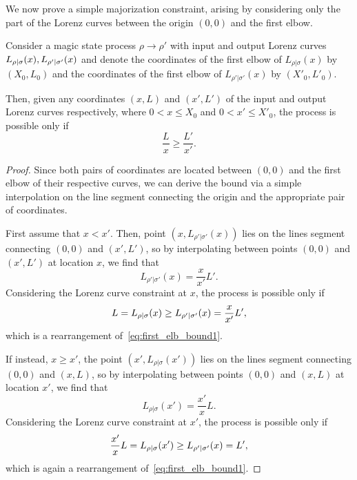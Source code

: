 \documentclass[pra,
aps,
twocolumn,
superscriptaddress,
groupedaddress,
nofootinbib,
reprint
]{revtex4-1}
\begin{document}
We now prove a simple majorization constraint, arising by considering only the part of the Lorenz curves between the origin $(0,0)$ and the first elbow.
\begin{proposition}\label{prop:first_elb}
	Consider a magic state process $\rho \longrightarrow \rho'$ with input and output Lorenz curves ${L_{\rho|\sigma}}(x), {L_{\rho'|\sigma'}}(x)$ and denote the coordinates of the first elbow of $L_{\rho|\sigma}(x)$ by $(X_0, L_0)$ and the coordinates of the first elbow of $L_{\rho' |\sigma'}(x)$ by $(X'_0, L'_0)$.
	
Then, given any coordinates $(x, L)$ and $(x', L')$ of the input and output Lorenz curves respectively, where $0 < x \leq X_0$ and $0 < x' \leq X'_0$, the process is possible only if
\begin{equation}\label{eq:first_elb_bound1}
	\frac{L}{x} \geq \frac{L'}{x'}.
\end{equation}
\end{proposition}
\begin{proof}
Since both pairs of coordinates are located between $(0,0)$ and the first elbow of their respective curves, we can derive the bound via a simple interpolation on the line segment connecting the origin and the appropriate pair of coordinates.

First assume that $x < x'$.
Then, point $(x, L_{\rho'|\sigma'}(x))$ lies on the lines segment connecting $(0,0)$ and $(x', L')$, so by interpolating between points $(0,0)$ and $(x', L')$ at location $x$, we find that
\begin{equation}
	L_{\rho'|\sigma'}(x) = \frac{x}{x'}L'.
\end{equation}
Considering the Lorenz curve constraint at $x$, the process is possible only if 
\begin{equation}
	L = {L_{\rho|\sigma}}(x) \geq {L_{\rho'|\sigma'}}(x) = \frac{x}{x'}L',
\end{equation}
which is a rearrangement of~\cref{eq:first_elb_bound1}.

If instead, $x \geq x'$, the point $(x', L_{\rho|\sigma}(x'))$ lies on the lines segment connecting $(0,0)$ and $(x, L)$, so by interpolating between points $(0,0)$ and $(x, L)$ at location $x'$, we find that
\begin{equation}
	L_{\rho|\sigma}(x') = \frac{x'}{x}L.
\end{equation}
Considering the Lorenz curve constraint at $x'$, the process is possible only if 
\begin{equation}
	\frac{x'}{x}L = {L_{\rho|\sigma}}(x') \geq {L_{\rho'|\sigma'}}(x) = L',
\end{equation}
which is again a rearrangement of~\cref{eq:first_elb_bound1}.
\end{proof}
\end{document}

